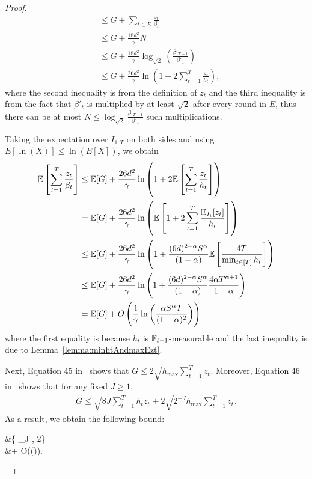 \begin{proof}
\begin{align*}
    &\leq G + \sum_{t \in E} \frac{z_t}{\beta_t} \\
    &\leq G + \frac{18d^2}{\gamma}N \\
    &\leq G + \frac{18d^2}{\gamma}\log_{\sqrt{2}}\left(\frac{\beta'_{T+1}}{\beta'_1}\right) \\
    &\leq G + \frac{26d^2}{\gamma}\ln\left(1 + 2\sum_{t=1}^T\frac{z_t}{h_t}\right),
\end{align*}
where the second inequality is from the definition of $z_t$ and the third inequality is from the fact that $\beta'_t$ is multiplied by at least $\sqrt{2}$ after every round in $E$, thus there can be at most $N \leq \log_{\sqrt{2}}\frac{\beta'_{T+1}}{\beta'_1}$ such multiplications.

Taking the expectation over $I_{1:T}$ on both sides and using $E[\ln(X)] \leq \ln(E[X])$, we obtain 
\begin{align*}
    \mathbb{E}\left[\sum_{t=1}^T \frac{z_t}{\beta_t}\right] &\leq \mathbb{E}[G] + \frac{26d^2}{\gamma}\ln\left(1 + 2\mathbb{E}\left[\sum_{t=1}^T \frac{z_t}{h_t}\right]\right) \\
    &= \mathbb{E}[G] + \frac{26d^2}{\gamma}\ln\left(\mathbb{E}\left[1 + 2\sum_{t=1}^T \frac{\mathbb{E}_{I_t}[z_{t}]}{h_t}\right]\right) \\
    &\leq \mathbb{E}[G] + \frac{26d^2}{\gamma}\ln\left(1 +\frac{(6d)^{2-\alpha}S^{\alpha}}{(1-\alpha)}\mathbb{E}\left[\frac{4T}{\min_{t \in [T]}h_t}\right]\right) \\
    &\leq \mathbb{E}[G] + \frac{26d^2}{\gamma}\ln\left(1 + \frac{(6d)^{2-\alpha}S^{\alpha}}{(1-\alpha)}\frac{4\alpha T^{\alpha + 1}}{1-\alpha}\right) \\
    &= \mathbb{E}[G] + O\left(\frac{1}{\gamma}\ln\left(\frac{\alpha S^{\alpha} T}{(1-\alpha)^2}\right)\right)
\end{align*}
where the first equality is because $h_t$ is ${\mathbb{F}}_{t-1}$-measurable and the last inequality is due to Lemma~\ref{lemma:minhtAndmaxEzt}.

Next, Equation 45 in~\cite{ItoCOLT2024} shows that $G \leq 2\sqrt{h_{\max}\sum_{t=1}^Tz_t}$. Moreover, Equation 46 in~\cite{ItoCOLT2024} shows that for any fixed $J \geq 1$,
\begin{align*}
    G \leq \sqrt{8J\sum_{t=1}^T h_tz_t} + 2\sqrt{2^{-J}h_{\max}\sum_{t=1}^T z_t}.
\end{align*}
As a result, we obtain the following bound:
\begin{nalign}
    \E\left[\sum_{t=1}^T \frac{z_t}{\beta_t}\right] &\leq \min\left\{ \inf_{J \in \sN}\E\left[\left\{ \sqrt{8J\sum_{t=1}^T h_t z_t} + 2\sqrt{2^{-J}h_{\max}\sum_{t=1}^Tz_t} \right\}\right], 2\E\left[\sqrt{ h_{\max}\sum_{t=1}^T z_t }\right] \right\} \\
    &+ O\left(\ln\left(\right)\right).
    \label{eq:boundztoverbetatbyItoCOLT2024}
\end{nalign}

\end{proof}
